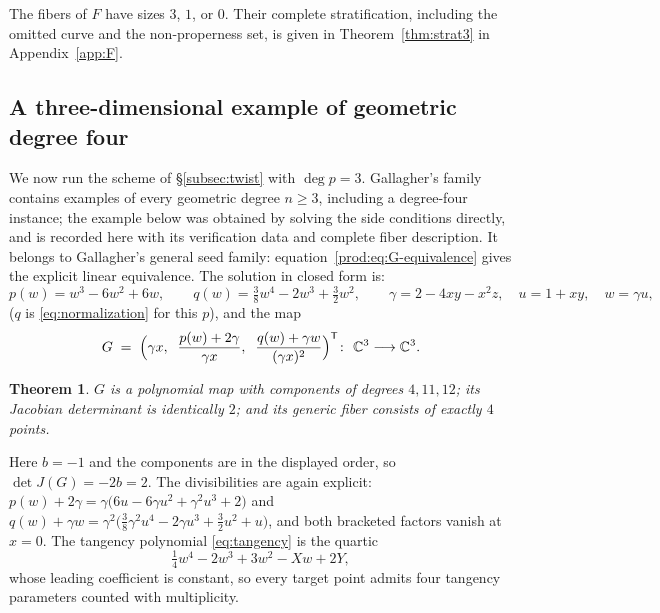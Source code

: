 \documentclass[11pt]{article}
\numberwithin{equation}{section}
\theoremstyle{plain}
\newtheorem{theorem}{Theorem}[section]
\theoremstyle{definition}
\theoremstyle{remark}
\newcommand{\C}{\mathbb{C}}
\begin{document}
The fibers of $F$ have sizes $3$, $1$, or $0$. Their complete
stratification, including the omitted curve and the non-properness set,
is given in Theorem~\ref{thm:strat3} in Appendix~\ref{app:F}.

\subsection{A three-dimensional example of geometric degree four}\label{sec:deg4}

We now run the scheme of \S\ref{subsec:twist} with $\deg p=3$. Gallagher's
family \cite{Gallagher2026} contains examples of every geometric degree
$n\ge3$, including a degree-four instance; the example below was obtained
by solving the side conditions directly, and is recorded here with
its verification data and complete fiber description. It belongs to
Gallagher's general seed family: equation~\eqref{prod:eq:G-equivalence}
gives the explicit linear equivalence. The solution in closed form is:
\[
p(w)=w^3-6w^2+6w,\qquad
q(w)=\tfrac38 w^4-2w^3+\tfrac32 w^2,\qquad
\gamma=2-4xy-x^2z,\quad u=1+xy,\quad w=\gamma u ,
\]
($q$ is \eqref{eq:normalization} for this $p$), and the map
\[
G\;=\;\Bigl(\gamma x,\;\;\frac{p(w)+2\gamma}{\gamma x},\;\;
\frac{q(w)+\gamma w}{(\gamma x)^2}\Bigr)^{\mathsf T}\colon\ \C^3\longrightarrow\C^3 .
\]

\begin{theorem}\label{thm:deg4}
$G$ is a polynomial map with components of degrees $4,11,12$; its Jacobian
determinant is identically $2$; and its generic fiber consists of exactly
$4$ points.
\end{theorem}

Here $b=-1$ and the components are in the displayed order, so
$\det J(G)=-2b=2$. The divisibilities are again explicit:
$p(w)+2\gamma=\gamma\bigl(6u-6\gamma u^2+\gamma^2u^3+2\bigr)$
and $q(w)+\gamma w=\gamma^2\bigl(\tfrac38\gamma^2u^4-2\gamma u^3+\tfrac32
u^2+u\bigr)$, and both bracketed factors vanish at $x=0$. The tangency
polynomial \eqref{eq:tangency} is the quartic
\[
\tfrac14 w^4-2w^3+3w^2-Xw+2Y ,
\]
whose leading coefficient is constant, so every target point admits four tangency
parameters counted with multiplicity.
\end{document}
